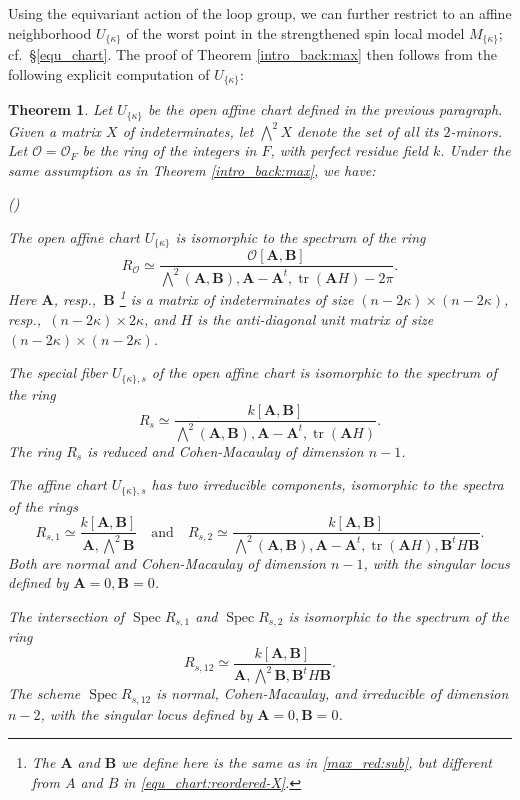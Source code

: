 \documentclass[pdflatex,sn-mathphys-num]{sn-jnl}%
\theoremstyle{thmstyleone}%
\newtheorem{theorem}[subsubsection]{Theorem}%
\theoremstyle{thmstyletwo}%
\numberwithin{equation}{subsection}
\theoremstyle{thmstylethree}%
\newcommand{\bA}{\ensuremath{\mathbf{A}}\xspace}
\newcommand{\bB}{\ensuremath{\mathbf{B}}\xspace}
\newcommand{\CO}{\ensuremath{\mathcal{O}}\xspace}
\DeclareMathOperator{\Spec}{Spec}
\DeclareMathOperator{\tr}{tr}
\newenvironment{altenumerate}
	{\begin{list}
			{(\theenumi) }
			{\usecounter{enumi}
				\setlength{\labelwidth}{0pt}
				\setlength{\labelsep}{0pt}
				\setlength{\leftmargin}{0pt}
				\setlength{\itemsep}{\the\smallskipamount}
				\renewcommand{\theenumi}{\roman{enumi}}
		}}
		{\end{list}}
\begin{document}
Using the equivariant action of the loop group, we can further restrict to an affine neighborhood $U_{\{\kappa\}}$ of the worst point in the strengthened spin local model $M_{\{\kappa\}}$; cf.\ \S \ref{equ_chart}.
The proof of Theorem \ref{intro_back:max} then follows from the following explicit computation of $U_{\{\kappa\}}$:
\begin{theorem}\label{intro_back:maxco}
Let $U_{\{\kappa\}}$ be the open affine chart defined in the previous paragraph.
Given a matrix $X$ of indeterminates, let $\bigwedge^2 X$ denote the set of all its $2$-minors. Let $\CO=\CO_F$ be the ring of the integers in $F$, with perfect residue field $k$.
Under the same assumption as in Theorem \ref{intro_back:max}, we have:
\begin{altenumerate}
\item The open affine chart $U_{\{\kappa\}}$ is isomorphic to the spectrum of the ring
\begin{equation*}
    R_{\CO}\simeq \frac{\CO[\bA,\bB]}{\bigwedge^2(\bA,\bB),\bA-\bA^t,\tr(\bA H)-2\pi}.
\end{equation*}
Here $\bA$, resp.,\ $\bB$
\footnote{The $\bA$ and $\bB$ we define here is the same as in \eqref{max_red:sub}, but different from $A$ and $B$ in \eqref{equ_chart:reordered-X}.}
is a matrix of indeterminates of size $(n-2\kappa)\times (n-2\kappa)$, resp.,\ $(n-2\kappa)\times 2\kappa$, and $H$ is the anti-diagonal unit matrix of size $(n-2\kappa)\times(n-2\kappa)$.
    \item The special fiber $U_{\{\kappa\},s}$ of the open affine chart is isomorphic to the spectrum of the ring
\begin{equation*}
    R_s\simeq \frac{k[\bA,\bB]}{\bigwedge^2(\bA,\bB),\bA-\bA^t,\tr(\bA H)}.
\end{equation*}
The ring $R_s$ is reduced and Cohen-Macaulay of dimension $n-1$. 

\item The affine chart $U_{\{\kappa\},s}$ has two irreducible components, isomorphic to the spectra of the rings
\begin{equation*}
    R_{s,1}\simeq \frac{k[\bA,\bB]}{\bA,\bigwedge^2 \bB}\quad\text{and}\quad R_{s,2}\simeq \frac{k[\bA,\bB]}{\bigwedge^2(\bA,\bB),\bA-\bA^t,\tr(\bA H),\bB^tH\bB}.
\end{equation*}
Both are normal and Cohen-Macaulay of dimension $n-1$, with the singular locus defined by $\bA=0,\bB=0$.

\item The intersection of $\Spec R_{s,1}$ and $\Spec R_{s,2}$ is isomorphic to the spectrum of the ring
\begin{equation*}
    R_{s,12}\simeq \frac{k[\bA,\bB]}{\bA,\bigwedge^2\bB,\bB^tH\bB}.
\end{equation*}
The scheme $\Spec R_{s,12}$ is normal, Cohen-Macaulay, and irreducible of dimension $n-2$, with the singular locus defined by $\bA=0,\bB=0$.
\end{altenumerate}
\end{theorem}
\end{document}
